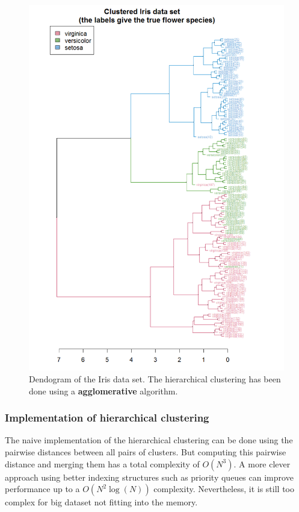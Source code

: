 \begin{figure}[H]%
 \centering
 \includegraphics[width=13cm]{./img/09/Iris_dendrogram}
 \caption{\label{pic:dendrogram} Dendogram of the Iris data set. The hierarchical clustering has been done using a {\bf agglomerative} algorithm.}
\end{figure}

\subsubsection{Implementation of hierarchical clustering} 

The naive implementation of the hierarchical clustering can be done using the pairwise distances between all pairs of clusters. But computing this pairwise distance and merging them has a total complexity of $O(N^{3})$. A more clever approach using better indexing structures such as priority queues can improve performance up to a $O(N^{2}\log(N))$ complexity. Nevertheless, it is still too complex for big dataset not fitting into the memory.

